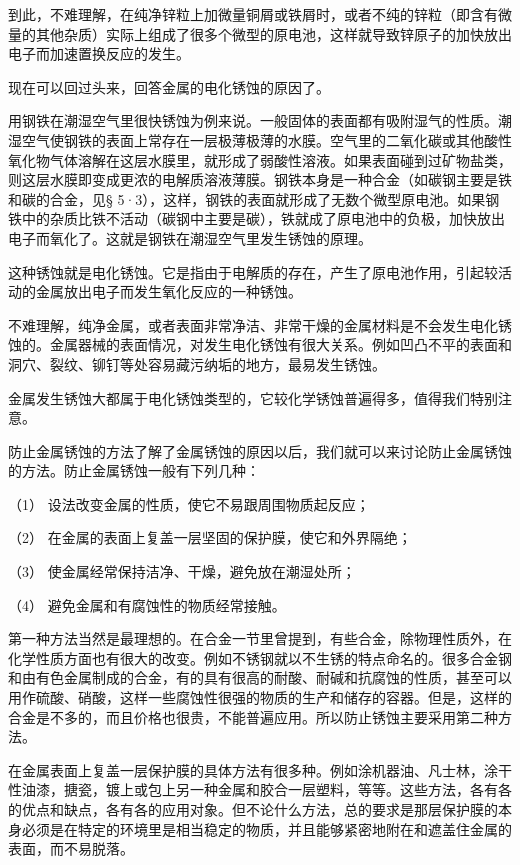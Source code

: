 到此，不难理解，在纯净锌粒上加微量铜屑或铁屑时，或者不纯的锌粒（即含有微量的其他杂质）实际上组成了很多个微型的原电池，这样就导致锌原子的加快放出电子而加速置换反应的发生。

现在可以回过头来，回答金属的电化锈蚀的原因了。

用钢铁在潮湿空气里很快锈蚀为例来说。一般固体的表面都有吸附湿气的性质。潮湿空气使钢铁的表面上常存在一层极薄极薄的水膜。空气里的二氧化碳或其他酸性氧化物气体溶解在这层水膜里，就形成了弱酸性溶液。如果表面碰到过矿物盐类，则这层水膜即变成更浓的电解质溶液薄膜。钢铁本身是一种合金（如碳钢主要是铁和碳的合金，见§
5·3），这样，钢铁的表面就形成了无数个微型原电池。如果钢铁中的杂质比铁不活动（碳钢中主要是碳），铁就成了原电池中的负极，加快放出电子而氧化了。这就是钢铁在潮湿空气里发生锈蚀的原理。

这种锈蚀就是电化锈蚀。它是指由于电解质的存在，产生了原电池作用，引起较活动的金属放出电子而发生氧化反应的一种锈蚀。

不难理解，纯净金属，或者表面非常净洁、非常干燥的金属材料是不会发生电化锈蚀的。金属器械的表面情况，对发生电化锈蚀有很大关系。例如凹凸不平的表面和洞穴、裂纹、铆钉等处容易藏污纳垢的地方，最易发生锈蚀。

金属发生锈蚀大都属于电化锈蚀类型的，它较化学锈蚀普遍得多，值得我们特别注意。

防止金属锈蚀的方法了解了金属锈蚀的原因以后，我们就可以来讨论防止金属锈蚀的方法。防止金属锈蚀一般有下列几种：

（1） 设法改变金属的性质，使它不易跟周围物质起反应；

（2） 在金属的表面上复盖一层坚固的保护膜，使它和外界隔绝；

（3） 使金属经常保持洁净、干燥，避免放在潮湿处所；

（4） 避免金属和有腐蚀性的物质经常接触。

第一种方法当然是最理想的。在合金一节里曾提到，有些合金，除物理性质外，在化学性质方面也有很大的改变。例如不锈钢就以不生锈的特点命名的。很多合金钢和由有色金属制成的合金，有的具有很高的耐酸、耐碱和抗腐蚀的性质，甚至可以用作硫酸、硝酸，这样一些腐蚀性很强的物质的生产和储存的容器。但是，这样的合金是不多的，而且价格也很贵，不能普遍应用。所以防止锈蚀主要采用第二种方法。

在金属表面上复盖一层保护膜的具体方法有很多种。例如涂机器油、凡士林，涂干性油漆，搪瓷，镀上或包上另一种金属和胶合一层塑料，等等。这些方法，各有各的优点和缺点，各有各的应用对象。但不论什么方法，总的要求是那层保护膜的本身必须是在特定的环境里是相当稳定的物质，并且能够紧密地附在和遮盖住金属的表面，而不易脱落。

